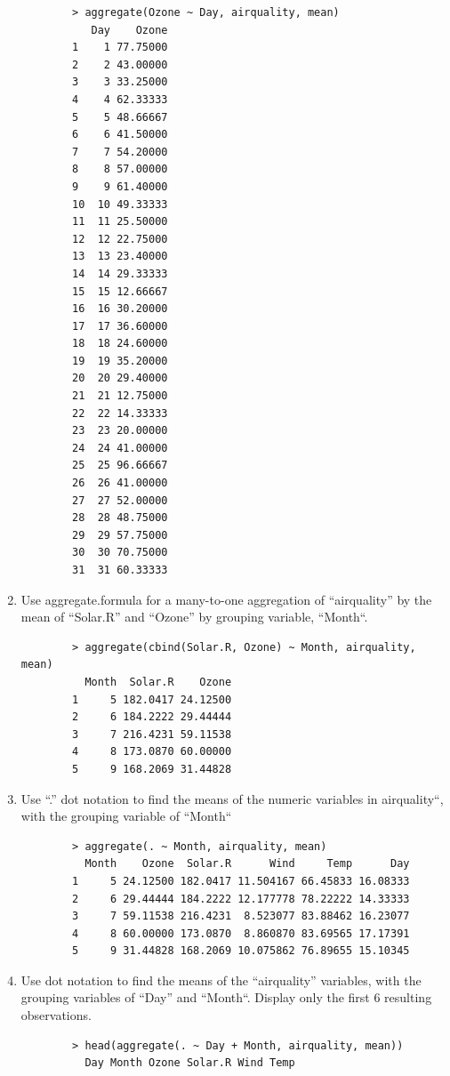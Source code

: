 \documentclass[10pt]{article}
\begin{document}
\begin{enumerate}
        \begin{verbatim}
        > aggregate(Ozone ~ Day, airquality, mean)
           Day    Ozone
        1    1 77.75000
        2    2 43.00000
        3    3 33.25000
        4    4 62.33333
        5    5 48.66667
        6    6 41.50000
        7    7 54.20000
        8    8 57.00000
        9    9 61.40000
        10  10 49.33333
        11  11 25.50000
        12  12 22.75000
        13  13 23.40000
        14  14 29.33333
        15  15 12.66667
        16  16 30.20000
        17  17 36.60000
        18  18 24.60000
        19  19 35.20000
        20  20 29.40000
        21  21 12.75000
        22  22 14.33333
        23  23 20.00000
        24  24 41.00000
        25  25 96.66667
        26  26 41.00000
        27  27 52.00000
        28  28 48.75000
        29  29 57.75000
        30  30 70.75000
        31  31 60.33333
        \end{verbatim}
    \item Use aggregate.formula for a many-to-one aggregation of “airquality” by the mean of “Solar.R” and “Ozone” by grouping variable, “Month“.
        \begin{verbatim}
        > aggregate(cbind(Solar.R, Ozone) ~ Month, airquality, mean)
          Month  Solar.R    Ozone
        1     5 182.0417 24.12500
        2     6 184.2222 29.44444
        3     7 216.4231 59.11538
        4     8 173.0870 60.00000
        5     9 168.2069 31.44828
        \end{verbatim}
    \item Use “.” dot notation to find the means of the numeric variables in airquality“, with the grouping variable of “Month“
        \begin{verbatim}
        > aggregate(. ~ Month, airquality, mean)
          Month    Ozone  Solar.R      Wind     Temp      Day
        1     5 24.12500 182.0417 11.504167 66.45833 16.08333
        2     6 29.44444 184.2222 12.177778 78.22222 14.33333
        3     7 59.11538 216.4231  8.523077 83.88462 16.23077
        4     8 60.00000 173.0870  8.860870 83.69565 17.17391
        5     9 31.44828 168.2069 10.075862 76.89655 15.10345
        \end{verbatim}
    \item Use dot notation to find the means of the “airquality” variables, with the grouping variables of “Day” and “Month“. Display only the first 6 resulting observations.
        \begin{verbatim}
        > head(aggregate(. ~ Day + Month, airquality, mean))
          Day Month Ozone Solar.R Wind Temp

\end{verbatim}
\end{enumerate}
\end{document}
